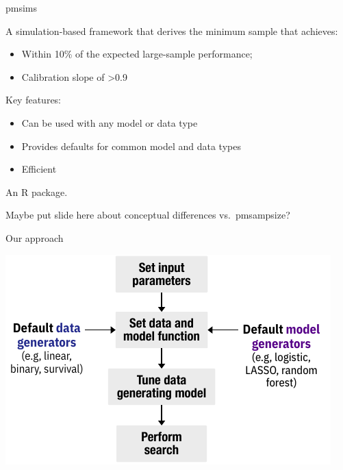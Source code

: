 \documentclass[11pt]{beamer}
\newcommand{\gap}{\vspace{0.8em}}
\begin{document}
\begin{frame}{pmsims}

	A simulation-based framework that derives the minimum sample that
	achieves:

	\begin{itemize}
		\item Within 10\% of the expected large-sample performance;
		\item Calibration slope of >0.9
	\end{itemize}

	\gap

	Key features:

	\begin{itemize}
		\item Can be used with any model or data type
		\item Provides defaults for common model and data types
		\item Efficient
	\end{itemize}

	\gap
	An R package.

\end{frame}

\begin{frame}[t]{Maybe put slide here about conceptual differences vs.\ pmsampsize?}

\end{frame}

\begin{frame}[c]{Our approach}

    \includegraphics[width=\textwidth]{figures/workflow1.pdf}

\end{frame}
\end{document}
